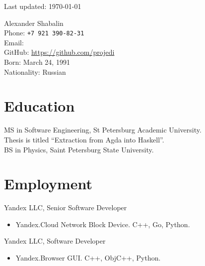 \thispagestyle{empty}

\begin{flushright}
\scriptsize Last updated: \today
\end{flushright}

{\LARGE Alexander Shabalin}\\[1cm]
Phone: \texttt{+7 921 390-82-31}\\
Email: \\
GitHub: \url{https://github.com/projedi}\\[.1cm]
Born: March 24, 1991\\
Nationality: Russian

\section*{Education}

   MS in Software Engineering, St Petersburg Academic University.\\
   Thesis is titled ``Extraction from Agda into Haskell''.\\[.3cm]
   BS in Physics, Saint Petersburg State University.

\section*{Employment}

  Yandex LLC, Senior Software Developer
  \begin{itemize}
    \itemsep 0cm
    \item Yandex.Cloud Network Block Device.
          C++, Go, Python.
  \end{itemize}

  Yandex LLC, Software Developer
  \begin{itemize}
    \itemsep 0cm
    \item Yandex.Browser GUI.
          C++, ObjC++, Python.
  \end{itemize}

